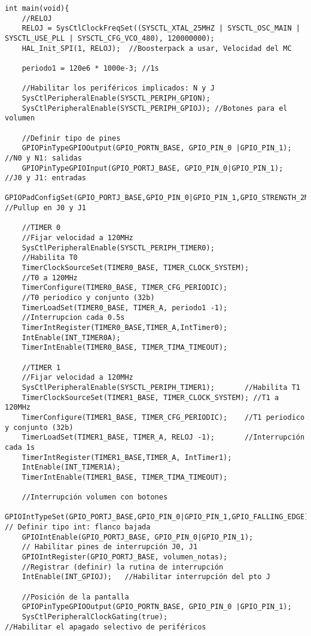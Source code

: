 \documentclass[12pt,a4paper]{article}
\begin{document}
\begin{lstlisting}[basicstyle=\footnotesize] 
int main(void){
    //RELOJ
    RELOJ = SysCtlClockFreqSet((SYSCTL_XTAL_25MHZ | SYSCTL_OSC_MAIN | SYSCTL_USE_PLL | SYSCTL_CFG_VCO_480), 120000000);
    HAL_Init_SPI(1, RELOJ);  //Boosterpack a usar, Velocidad del MC

    periodo1 = 120e6 * 1000e-3; //1s

    //Habilitar los periféricos implicados: N y J
    SysCtlPeripheralEnable(SYSCTL_PERIPH_GPION);
    SysCtlPeripheralEnable(SYSCTL_PERIPH_GPIOJ); //Botones para el volumen

    //Definir tipo de pines
    GPIOPinTypeGPIOOutput(GPIO_PORTN_BASE, GPIO_PIN_0 |GPIO_PIN_1); //N0 y N1: salidas
    GPIOPinTypeGPIOInput(GPIO_PORTJ_BASE, GPIO_PIN_0|GPIO_PIN_1);   //J0 y J1: entradas
    GPIOPadConfigSet(GPIO_PORTJ_BASE,GPIO_PIN_0|GPIO_PIN_1,GPIO_STRENGTH_2MA,GPIO_PIN_TYPE_STD_WPU); //Pullup en J0 y J1

    //TIMER 0
    //Fijar velocidad a 120MHz
    SysCtlPeripheralEnable(SYSCTL_PERIPH_TIMER0);           
    //Habilita T0
    TimerClockSourceSet(TIMER0_BASE, TIMER_CLOCK_SYSTEM);   
    //T0 a 120MHz
    TimerConfigure(TIMER0_BASE, TIMER_CFG_PERIODIC);        
    //T0 periodico y conjunto (32b)
    TimerLoadSet(TIMER0_BASE, TIMER_A, periodo1 -1);       
    //Interrupcion cada 0.5s
    TimerIntRegister(TIMER0_BASE,TIMER_A,IntTimer0);
    IntEnable(INT_TIMER0A);
    TimerIntEnable(TIMER0_BASE, TIMER_TIMA_TIMEOUT);

    //TIMER 1
    //Fijar velocidad a 120MHz
    SysCtlPeripheralEnable(SYSCTL_PERIPH_TIMER1);       //Habilita T1
    TimerClockSourceSet(TIMER1_BASE, TIMER_CLOCK_SYSTEM); //T1 a 120MHz
    TimerConfigure(TIMER1_BASE, TIMER_CFG_PERIODIC);    //T1 periodico y conjunto (32b)
    TimerLoadSet(TIMER1_BASE, TIMER_A, RELOJ -1);       //Interrupción cada 1s
    TimerIntRegister(TIMER1_BASE,TIMER_A, IntTimer1);
    IntEnable(INT_TIMER1A);
    TimerIntEnable(TIMER1_BASE, TIMER_TIMA_TIMEOUT);

    //Interrupción volumen con botones
    GPIOIntTypeSet(GPIO_PORTJ_BASE,GPIO_PIN_0|GPIO_PIN_1,GPIO_FALLING_EDGE); // Definir tipo int: flanco bajada
    GPIOIntEnable(GPIO_PORTJ_BASE, GPIO_PIN_0|GPIO_PIN_1);  
    // Habilitar pines de interrupción J0, J1
    GPIOIntRegister(GPIO_PORTJ_BASE, volumen_notas);  
    //Registrar (definir) la rutina de interrupción
    IntEnable(INT_GPIOJ);   //Habilitar interrupción del pto J

    //Posición de la pantalla
    GPIOPinTypeGPIOOutput(GPIO_PORTN_BASE, GPIO_PIN_0 |GPIO_PIN_1);
    SysCtlPeripheralClockGating(true);                      //Habilitar el apagado selectivo de periféricos


\end{lstlisting}
\end{document}
